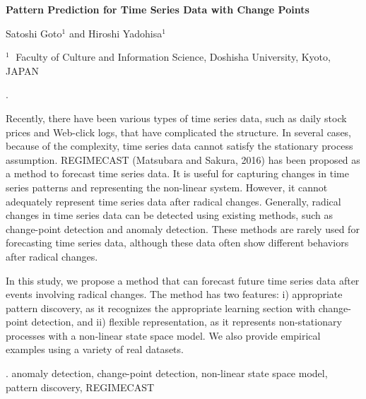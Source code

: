 \documentclass[12pt]{article}
\begin{document}
\begin{flushleft}


 {\LARGE\bf Pattern Prediction for Time Series
 	 Data with Change Points}


\vspace{1.0cm}

Satoshi Goto$^1$ and Hiroshi Yadohisa$^1$

\begin{description}

\item $^1 \;$ Faculty of Culture and Information Science, Doshisha University, Kyoto, JAPAN

\end{description}

\end{flushleft}


\vspace{0.75cm}

.

Recently, there have been various types of time series data, such as daily stock prices and Web-click logs, that have complicated the structure. In several cases, because of the complexity, time series data cannot satisfy the stationary process assumption. REGIMECAST (Matsubara and Sakura, 2016) has been proposed as a method to forecast time series data. It is useful for capturing changes in time series patterns and representing the non-linear system. However, it cannot adequately represent time series data after radical changes. Generally, radical changes in time series data can be detected using existing methods, such as change-point detection and anomaly detection. These methods are rarely used for forecasting time series data, although these data often show different behaviors after radical changes.

In this study, we propose a method that can forecast future time series data after events involving radical changes. The method has two features: i) appropriate pattern discovery, as it recognizes the appropriate learning section with change-point detection, and ii) flexible representation, as it represents non-stationary processes with a non-linear state space model. We also provide empirical examples using a variety of real datasets. 


\vskip 2mm

. anomaly detection, change-point detection, non-linear state space model, pattern discovery, REGIMECAST
\end{document}
